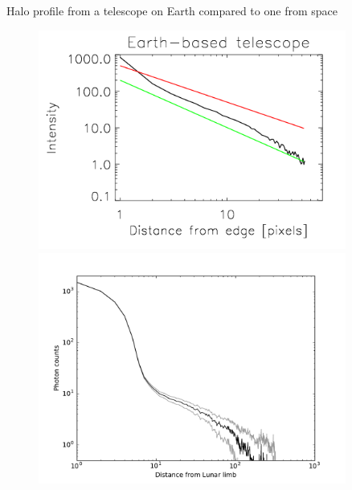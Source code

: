 \documentclass[final,hyperref={pdfpagelabels=false}]{beamer}
\begin{document}
\begin{frame}[t]
\begin{columns}[t]
\begin{column}{.23\textwidth}
\end{column} %

\begin{column}{.01\textwidth}\end{column} %
\begin{column}{.23\textwidth}
\begin{block}{Halo profile from a telescope on Earth compared to one from space}
\begin{figure}
\centering 
\includegraphics[scale=.7]{fig/MLOprofile.png}
\includegraphics[scale=.6]{fig/fl-moon.pdf}

\end{figure}
\end{block}
\end{column}
\end{columns}
\end{frame}
\end{document}
